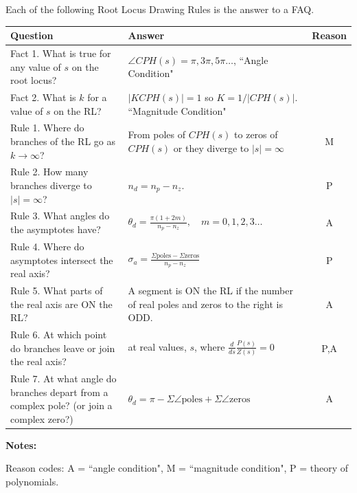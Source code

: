 

Each of the following Root Locus Drawing Rules is the answer to a FAQ.

\renewcommand\arraystretch{2.5}%
\begin{tabular}{p{2.5in}|p{2.5in}|c}
Question			&  Answer			& Reason	\\ \hline \hline
Fact 1. What is true for any value of $s$ on the root locus?
				&  $\angle{CPH(s)} = \pi, 3\pi, 5\pi \dots$, ``Angle Condition" &     \\ \hline
Fact 2. What is $k$ for a value of $s$ on the RL?  &
$|KCPH(s)| = 1$ so $ K = 1/|CPH(s)|$. ``Magnitude Condition"                          &     \\ \hline\hline
Rule 1. Where do branches of the RL go as $k \to \infty$?  &
From poles of $CPH(s)$ to zeros of $CPH(s)$ or they diverge to $|s| = \infty$         & M     \\ \hline
Rule 2. How many branches diverge to  $|s| = \infty$?      &
$n_d = n_p-n_z$.                                                                & P      \\ \hline
Rule 3. What angles do the asymptotes have?                 &
$\theta_d = \frac{\pi(1+2m)}{n_p-n_z},\quad m= 0,1,2,3\dots$                    & A      \\ \hline
Rule 4. Where do asymptotes intersect the real axis?        &
$\sigma_a = \frac{\Sigma\mathrm{poles}- \Sigma\mathrm{zeros}}{n_p-n_z} $        & P      \\ \hline
Rule 5. What parts of the real axis are ON the RL?          &
A segment is ON the RL if the number of real poles and zeros to the right is ODD. & A     \\ \hline \hline
Rule 6. At which point do branches leave or join the real axis?    &
at real values, $s$, where $\frac{d}{ds}\frac{P(s)}{Z(s)}=0$                      & P,A    \\ \hline
Rule 7. At what angle do branches depart from a complex pole? (or join a complex zero?) &
$\theta_d = \pi-\Sigma\angle\mathrm{poles} + \Sigma\angle\mathrm{zeros} $           & A      \\ \hline
\end{tabular}


{\bf Notes:}

Reason codes:
A = ``angle condition", M = ``magnitude condition", P = theory of polynomials.

